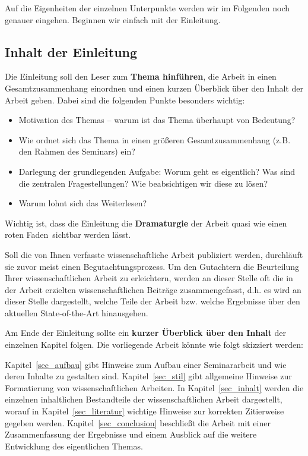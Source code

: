 Auf die Eigenheiten der einzelnen Unterpunkte werden wir im Folgenden noch genauer eingehen.
Beginnen wir einfach mit der Einleitung.

\subsection{Inhalt der Einleitung}
Die Einleitung soll den Leser zum {\bf Thema hinführen}, die Arbeit in einen Gesamtzusammenhang einordnen und einen kurzen Überblick über den Inhalt der Arbeit geben. 
Dabei sind die folgenden Punkte besonders wichtig:

\begin{itemize}
\item Motivation des Themas -- warum ist das Thema überhaupt von Bedeutung?
\item Wie ordnet sich das Thema in einen größeren Gesamtzusammenhang (z.B. den Rahmen des Seminars) ein?
\item Darlegung der grundlegenden Aufgabe: Worum geht es eigentlich? Was sind die zentralen Fragestellungen? Wie beabsichtigen wir diese zu lösen?
\item Warum lohnt sich das Weiterlesen? 
\end{itemize}
Wichtig ist, dass die Einleitung die {\bf Dramaturgie} der Arbeit quasi wie einen \glqq roten Faden\grqq\, sichtbar werden lässt.

\bigskip

Soll die von Ihnen verfasste wissenschaftliche Arbeit publiziert werden, durchläuft sie zuvor meist einen Begutachtungsprozess.
Um den Gutachtern die Beurteilung Ihrer wissenschaftlichen Arbeit zu erleichtern, werden an dieser Stelle oft die in der Arbeit erzielten wissenschaftlichen Beiträge zusammengefasst, d.h. es wird an dieser Stelle dargestellt, welche Teile der Arbeit bzw. welche Ergebnisse über den aktuellen State-of-the-Art hinausgehen. 

\bigskip

Am Ende der Einleitung sollte ein \textbf{kurzer Überblick über den Inhalt} der einzelnen Kapitel folgen. 
Die vorliegende Arbeit könnte wie folgt skizziert werden:

\bigskip

Kapitel~\ref{sec_aufbau} gibt Hinweise zum Aufbau einer Seminararbeit und wie deren Inhalte zu gestalten sind.
Kapitel~\ref{sec_stil} gibt allgemeine Hinweise zur Formatierung von wissenschaftlichen Arbeiten.
In Kapitel~\ref{sec_inhalt} werden die einzelnen inhaltlichen Bestandteile der wissenschaftlichen Arbeit dargestellt, worauf in Kapitel~\ref{sec_literatur} wichtige Hinweise zur korrekten Zitierweise gegeben werden.
Kapitel~\ref{sec_conclusion} beschließt die Arbeit mit einer Zusammenfassung der Ergebnisse und einem Ausblick auf die weitere Entwicklung des eigentlichen Themas.


